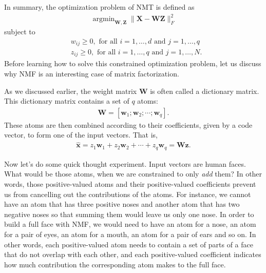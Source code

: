 \documentclass{report}
\newcommand{\vect}[1]{\mathbf{#1}}
\newcommand{\matr}[1]{\mathbf{#1}}
\newcommand{\vx}[0]{\vect{x}}
\newcommand{\vz}[0]{\vect{z}}
\newcommand{\vw}[0]{\vect{w}}
\newcommand{\mW}[0]{\matr{W}}
\newcommand{\mZ}[0]{\matr{Z}}
\newcommand{\mX}[0]{\matr{X}}
\DeclareMathOperator*{\argmin}{\arg \min}
\begin{document}
In summary, the optimization problem of NMT is defined as
\begin{align}
    \label{eq:nmf}
    \argmin_{\mW, \mZ} \| \mX - \mW \mZ \|_F^2
\end{align}
subject to
\begin{align*}
    &w_{ij} \geq 0,\text{ for all }i=1,\ldots,d\text{ and }j=1,\ldots,q \\
    &z_{ij} \geq 0,\text{ for all }i=1,\ldots,q\text{ and }j=1,\ldots,N.
\end{align*}
Before learning how to solve this constrained optimization problem, let us
discuss why NMF is an interesting case of matrix factorization. 

As we discussed earlier, the weight matrix $\mW$ is often called a dictionary
matrix. This dictionary matrix contains a set of $q$ atoms:
\begin{align*}
    \mW = \left[ \vw_1; \vw_2; \cdots; \vw_q \right].
\end{align*}
These atoms are then combined according to their coefficients, given by a code
vector, to form one of the input vectors. That is,
\begin{align*}
    \hat{\vx} = z_1 \vw_1 + z_2 \vw_2 + \cdots + z_q \vw_q = \mW \vz.
\end{align*}

Now let's do some quick thought experiment. Input vectors are human faces. What
would be those atoms, when we are constrained to only {\it add} them? In other
words, those positive-valued atoms and their positive-valued coefficients
prevent us from cancelling out the contributions of the atoms. For instance, we
cannot have an atom that has three positive noses and another atom that has two
negative noses so that summing them would leave us only one nose. In order to
build a full face with NMF, we would need to have an atom for a nose, an atom
for a pair of eyes, an atom for a mouth, an atom for a pair of ears and so on.
In other words, each positive-valued atom needs to contain a set of parts of a
face that do not overlap with each other, and each positive-valued coefficient
indicates how much contribution the corresponding atom makes to the full face.
\end{document}
